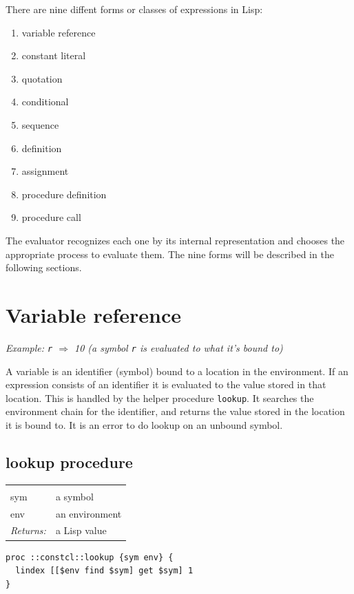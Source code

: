 \documentclass[twoside,9pt]{report}
\begin{document}
There are nine diffent forms or classes of expressions in Lisp:

\begin{enumerate}
\item  variable reference
\item  constant literal
\item  quotation
\item  conditional
\item  sequence
\item  definition
\item  assignment
\item  procedure definition
\item  procedure call
\end{enumerate}


The evaluator recognizes each one by its internal representation and chooses the appropriate process to evaluate them. The nine forms will be described in the following sections.

\section{Variable reference}
\label{variable-reference}


\emph{Example: \texttt{r} $\Rightarrow$ 10 (a symbol \texttt{r} is evaluated to what it's bound to)}


A variable is an identifier (symbol) bound to a location in the environment. If an expression consists of an identifier it is evaluated to the value stored in that location. This is handled by the helper procedure \texttt{lookup}. It searches the environment chain for the identifier, and returns the value stored in the location it is bound to. It is an error to do lookup on an unbound symbol.

\subsection{lookup procedure}
\label{lookup-procedure}
\noindent\begin{tabular}{ |p{1.9cm} p{8cm}| }
\hline
\rowcolor[HTML]{CCCCCC} \multicolumn{2}{|l|}{\bf lookup (internal)} \\
sym & a symbol \\
env & an environment \\
\textit{Returns:} & a Lisp value \\
\hline
\end{tabular}
\begin{lstlisting}
proc ::constcl::lookup {sym env} {
  lindex [[$env find $sym] get $sym] 1
}
\end{lstlisting}
\end{document}
